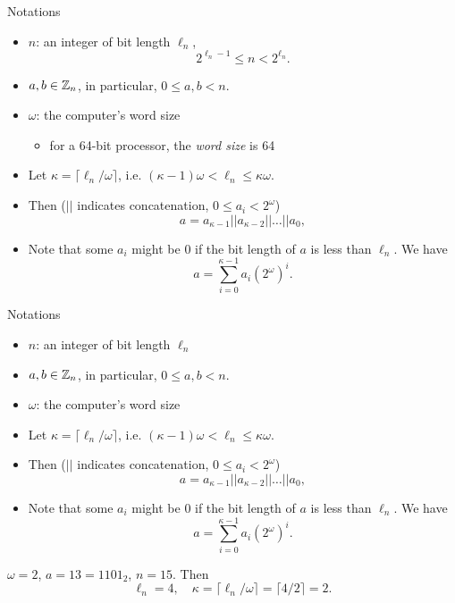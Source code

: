 \begin{frame}{Notations}
    \begin{itemize}
        \item $n$: an integer of bit length $\ell_n$, 
\begin{equation*}
    2^{\ell_n-1}\leq n<2^{\ell_n}.
\end{equation*}
        \item $a, b\in{\mathbb Z}_n$, in particular, $0\leq a,b<n$.
       \item $\omega$: the computer's word size
       \begin{itemize}
           \item for a 64-bit processor, the \textit{word size} is 64
       \end{itemize}
       \item Let $\kappa=\lceil \ell_n/\omega\rceil$, i.e. $(\kappa-1)\omega<\ell_n\leq \kappa\omega$.
      \item Then ($||$ indicates concatenation, $0\leq a_i< 2^{\omega}$)
\[
a=a_{\kappa-1}||a_{\kappa-2}||\dots||a_0,
\]
      \item Note that some $a_i$ might be $0$ if the bit length of $a$ is less than $\ell_n$. We have
\begin{equation*}
a=\sum_{i=0}^{\kappa-1}a_i(2^\omega)^i.
\end{equation*}
    \end{itemize}
\end{frame}

\begin{frame}{Notations}
     \begin{itemize}
        \item $n$: an integer of bit length $\ell_n$
        \item $a, b\in{\mathbb Z}_n$, in particular, $0\leq a,b<n$.
       \item $\omega$: the computer's word size
       \item Let $\kappa=\lceil \ell_n/\omega\rceil$, i.e. $(\kappa-1)\omega<\ell_n\leq \kappa\omega$.
      \item Then ($||$ indicates concatenation, $0\leq a_i< 2^{\omega}$)
\[
a=a_{\kappa-1}||a_{\kappa-2}||\dots||a_0,
\]
      \item Note that some $a_i$ might be $0$ if the bit length of $a$ is less than $\ell_n$. We have
\begin{equation*}
a=\sum_{i=0}^{\kappa-1}a_i(2^\omega)^i.
\end{equation*}
    \end{itemize}
\begin{example}
    $\omega=2$,  $a=13=1101_2$, $n=15$.
    Then
    \[
    \ell_n= 4,\quad
    \kappa=\lceil \ell_n/\omega\rceil=\lceil 4/2\rceil=2.
    \]
\end{example}
\end{frame}


